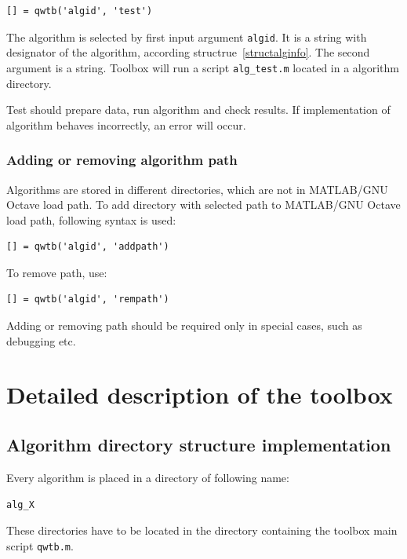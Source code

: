 \documentclass[12pt,a4paper,oneside]{report} %
\def\matlab{{\sc MATLAB}\xspace}
\def\octave{{\sc GNU Octave}\xspace}
\def\mgo{\matlab/\octave\xspace}
\begin{document}
\begin{lstlisting}
[] = qwtb('algid', 'test')
\end{lstlisting}

The algorithm is selected by first input argument \lstinline{algid}. It is a string with
designator of the algorithm, according structrue~\ref{structalginfo}. The second argument is a
string. Toolbox will run a script \lstinline{alg_test.m} located in a algorithm directory.

Test should prepare data, run algorithm and check results. If implementation of algorithm
behaves incorrectly, an error will occur.

\subsection{Adding or removing algorithm path} %
Algorithms are stored in different directories, which are not in \mgo load path. To add directory
with selected path to \mgo load path, following syntax is used:

\begin{lstlisting}
[] = qwtb('algid', 'addpath')
\end{lstlisting}

To remove path, use:

\begin{lstlisting}
[] = qwtb('algid', 'rempath')
\end{lstlisting}

Adding or removing path should be required only in special cases, such as debugging etc.

\chapter{Detailed description of the toolbox} %
\section{Algorithm directory structure implementation} %
Every algorithm is placed in a directory of following name:
\begin{center}
        {\tt alg\_X}
\end{center}
These directories have to be located in the directory containing the toolbox main script {\tt qwtb.m}.
\end{document}
